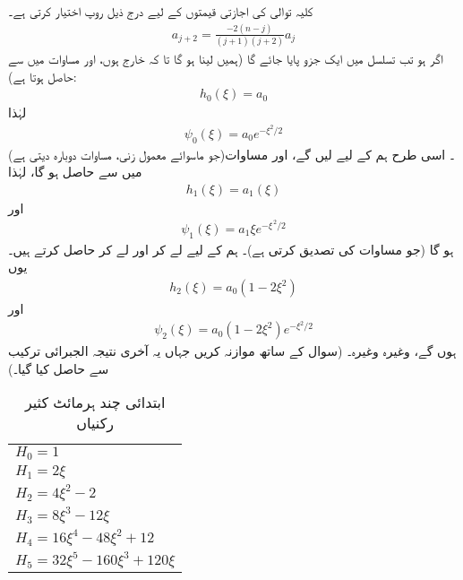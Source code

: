  کلیہ توالی  کی اجازتی قیمتوں کے لیے  درج ذیل روپ اختیار کرتی ہے۔
\begin{align}\label{مساوات_شروڈنگر_کلیہ_توالی_اجازتی_الف}
a_{j+2}=\frac{-2(n-j)}{(j+1)(j+2)}a_{j}
\end{align}
اگر  ہو تب تسلسل میں ایک جزو پایا جائے گا (ہمیں  لینا ہو گا تا کہ  خارج ہوں، اور مساوات  میں  سے  حاصل ہوتا ہے):
\begin{align*}
h_{0}(\xi)=a_{0}
\end{align*}
لہٰذا
\begin{align*}
\psi_{0}(\xi)=a_{0}e^{-\xi^{2}/2}
\end{align*}
(جو ماسوائے معمول زنی،  مساوات  دوبارہ دیتی ہے)۔ اسی طرح ہم  کے لیے 
 لیں گے، اور مساوات  میں  سے 
حاصل ہو گا، لہٰذا 
\begin{align*}
h_{1}(\xi)=a_{1}(\xi)
\end{align*}
اور
\begin{align*}
\psi_{1}(\xi)=a_{1}\xi e^{-\xi^{\,2}/2}
\end{align*}
ہو گا (جو مساوات  کی تصدیق کرتی ہے)۔ ہم  کے لیے   لے کر
 اور  لے کر  حاصل کرتے ہیں۔ یوں
\begin{align*}
h_{2}(\xi)=a_{0}(1-2\xi^{2})
\end{align*}
اور
\begin{align*}
\psi_{2}(\xi)=a_{0}(1-2\xi^{2})e^{-\xi^{2}/2}
\end{align*}
ہوں گے، وغیرہ  وغیرہ۔ (سوال  کے ساتھ موازنہ کریں جہاں یہ آخری نتیجہ الجبرائی ترکیب سے حاصل کیا گیا۔) 
\begin{table}
\caption{ابتدائی چند ہرمائٹ کثیر رکنیاں }
\label{جدول_شروڈنگر_ہرمشی_کثیر_رکنیاں}
\centering
\begin{tabular}{l}
$H_0=1$\\
$H_1=2\xi$\\
$H_2=4\xi^2-2$\\
$H_3=8\xi^3-12\xi$\\
$H_4=16\xi^4-48\xi^2+12$\\
$H_5=32\xi^5-160\xi^3+120\xi$
\end{tabular}
\end{table}
